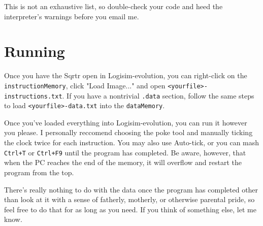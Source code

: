 \documentclass[12pt, oneside]{memoir}
\newcommand{\header}[1]{{\color{header}\texttt{#1}}}
\begin{document}
This is not an exhaustive list, so double-check your code and heed the interpreter's warnings before you email me.



\chapter{Running}
Once you have the Sqrtr open in Logisim-evolution, you can right-click on the \texttt{instructionMemory}, click "Load Image..." and open \texttt{<yourfile>-instructions.txt}. If you have a nontrivial \header{.data} section, follow the same steps to load \texttt{<yourfile>-data.txt} into the \texttt{dataMemory}.

Once you've loaded everything into Logisim-evolution, you can run it however you please. I personally reccomend choosing the poke tool and manually ticking the clock twice for each instruction. You may also use Auto-tick, or you can mash \texttt{Ctrl+T} or \texttt{Ctrl+F9} until the program has completed. Be aware, however, that when the PC reaches the end of the memory, it will overflow and restart the program from the top. 

There's really nothing to do with the data once the program has completed other than look at it with a sense of fatherly, motherly, or otherwise parental pride, so feel free to do that for as long as you need. If you think of something else, let me know.
\end{document}
